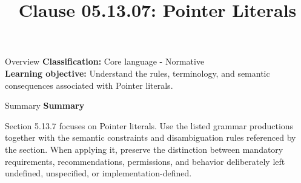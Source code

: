 \documentclass[10pt,letterpaper]{article}
\title{Clause 05.13.07: Pointer Literals}
\author{}
\date{}
\begin{document}
\maketitle
\begin{CornellOverviewBox}{Overview}
\textbf{Classification:} Core language - Normative\\[2pt]
\textbf{Learning objective:} Understand the rules, terminology, and semantic consequences associated with Pointer literals.
\end{CornellOverviewBox}\begin{CornellSummaryBox}{Summary}
{\sffamily\bfseries\color{Accent} Summary}\par\vspace{3pt}Section 5.13.7 focuses on Pointer literals. Use the listed grammar productions together with the semantic constraints and disambiguation rules referenced by the section. When applying it, preserve the distinction between mandatory requirements, recommendations, permissions, and behavior deliberately left undefined, unspecified, or implementation-defined.
\end{CornellSummaryBox}
\end{document}
